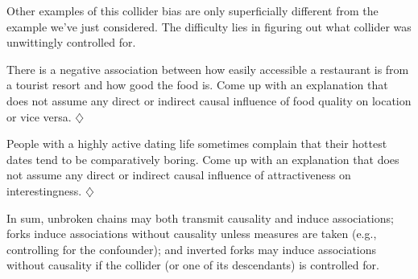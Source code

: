 \documentclass[a4paper]{tufte-book}\usepackage[]{graphicx}\usepackage[]{xcolor}
\newcommand*{\parend}[1][$\diamondsuit$]{%
  \unskip\nobreak\hspace{1em plus 1fill}$\diamondsuit$%
}
\begin{document}
Other examples of this collider bias are only superficially different
from the example we've just considered.
The difficulty lies in figuring out what collider was unwittingly controlled for.

  There is a negative association between how easily accessible a restaurant
  is from a tourist resort and how good the food is.
  Come up with an explanation that does not assume any direct or indirect
  causal influence of food quality on location or vice versa.
\parend

  People with a highly active dating life sometimes complain that their
  hottest dates tend to be comparatively boring.
  Come up with an explanation that does not assume any direct or indirect
  causal influence of attractiveness on interestingness.
\parend

\begin{framed}
In sum, unbroken chains may both transmit causality and induce associations;
forks induce associations without causality unless measures are taken 
(e.g., controlling for the confounder);
and inverted forks may induce associations without causality if the collider 
(or one of its descendants) is controlled for.
\end{framed}
\end{document}
